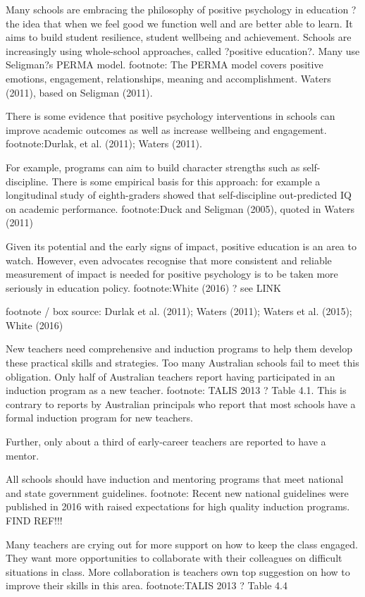 Many schools are embracing the philosophy of positive psychology in education ? the idea that when we feel good we function well and are better able to learn. It aims to build student resilience, student wellbeing and achievement. Schools are increasingly using whole-school approaches, called ?positive education?. Many use Seligman?s PERMA model. footnote: The PERMA model covers positive emotions, engagement, relationships, meaning and accomplishment. Waters (2011), based on Seligman (2011). 

There is some evidence that positive psychology interventions in schools can improve academic outcomes as well as increase wellbeing and engagement. footnote:Durlak, et al. (2011); Waters (2011).

For example, programs can aim to build character strengths such as self-discipline. There is some empirical basis for this approach: for example a longitudinal study of eighth-graders showed that self-discipline out-predicted IQ on academic performance. footnote:Duck and Seligman (2005), quoted in Waters (2011) 

Given its potential and the early signs of impact, positive education is an area to watch. However, even advocates recognise that more consistent and reliable measurement of impact is needed for positive psychology is to be taken more seriously in education policy. footnote:White (2016) ? see LINK

footnote / box source: Durlak et al. (2011); Waters (2011); Waters et al. (2015); White (2016)

New teachers need comprehensive and induction programs to help them develop these practical skills and strategies. Too many Australian schools fail to meet this obligation. Only half of Australian teachers report having participated in an induction program as a new teacher. footnote: TALIS 2013 ? Table 4.1. This is contrary to reports by Australian principals who report that most schools have a formal induction program for new teachers.

Further, only about a third of early-career teachers are reported to have a mentor. %

All schools should have induction and mentoring programs that meet national and state government guidelines. footnote: Recent new national guidelines were published in 2016 with raised expectations for high quality induction programs. FIND REF!!!

Many teachers are crying out for more support on how to keep the class engaged. They want more opportunities to collaborate with their colleagues on difficult situations in class. More collaboration is teachers own top suggestion on how to improve their skills in this area.  footnote:TALIS 2013 ? Table 4.4

